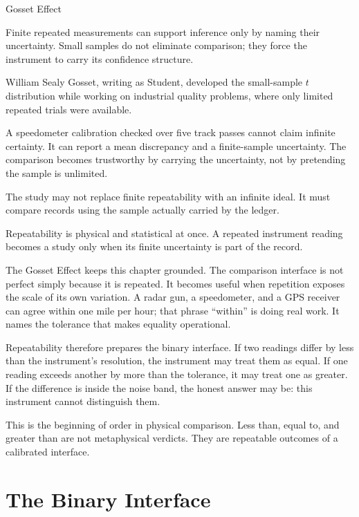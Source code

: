 \begin{phenom}{Gosset Effect}
\label{ph:gosset-effect}

\PhStatement Finite repeated measurements can support inference only by naming
their uncertainty. Small samples do not eliminate comparison; they force the
instrument to carry its confidence structure.

\PhOrigin William Sealy Gosset, writing as Student, developed the
small-sample $t$ distribution while working on industrial quality problems,
where only limited repeated trials were available.

\PhObservation A speedometer calibration checked over five track passes cannot
claim infinite certainty. It can report a mean discrepancy and a finite-sample
uncertainty. The comparison becomes trustworthy by carrying the uncertainty,
not by pretending the sample is unlimited.

\PhConstraint The study may not replace finite repeatability with an infinite
ideal. It must compare records using the sample actually carried by the ledger.

\PhConsequence Repeatability is physical and statistical at once. A repeated
instrument reading becomes a study only when its finite uncertainty is part of
the record.

\end{phenom}

The Gosset Effect keeps this chapter grounded. The comparison interface is not
perfect simply because it is repeated. It becomes useful when repetition exposes
the scale of its own variation. A radar gun, a speedometer, and a GPS receiver
can agree within one mile per hour; that phrase ``within'' is doing real work.
It names the tolerance that makes equality operational.

Repeatability therefore prepares the binary interface. If two readings differ
by less than the instrument's resolution, the instrument may treat them as
equal. If one reading exceeds another by more than the tolerance, it may treat
one as greater. If the difference is inside the noise band, the honest answer
may be: this instrument cannot distinguish them.

This is the beginning of order in physical comparison. Less than, equal to, and
greater than are not metaphysical verdicts. They are repeatable outcomes of a
calibrated interface.

\section{The Binary Interface}
\label{se:the-binary-interface}

